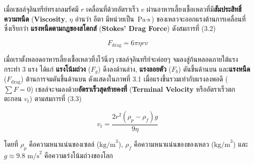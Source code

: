 เมื่อเซลล์จุลินทรีย์ทรงกลมรัศมี $r$ เคลื่อนที่ด้วยอัตราเร็ว $v$ ผ่านอาหารเลี้ยงเชื้อเหลวที่มี\textbf{สัมประสิทธิ์ความหนืด} (\textbf{Viscosity}, $\eta$ อ่านว่า อีตา มีหน่วยเป็น $\text{Pa}\cdot\text{s}$) ของเหลวจะออกแรงต้านการเคลื่อนที่ซึ่งเรียกว่า \textbf{แรงหนืดตามกฎของสโตกส์} (\textbf{Stokes' Drag Force}) ดังสมการที่ (3.2)

\begin{equation}
    F_{\text{drag}} = 6 \pi \eta r v
\end{equation}

เมื่อเราตั้งหลอดอาหารเลี้ยงเชื้อเหลวทิ้งไว้นิ่งๆ เซลล์จุลินทรีย์จะค่อยๆ จมลงสู่ก้นหลอดภายใต้แรงกระทำ 3 แรง ได้แก่ \textbf{แรงโน้มถ่วง} ($F_g$) ดึงลงด้านล่าง, \textbf{แรงลอยตัว} ($F_b$) ดันขึ้นด้านบน และ\textbf{แรงหนืด} ($F_{\text{drag}}$) ต้านการจมดันขึ้นด้านบน ดังแสดงใน\mbox{ภาพที่} 3.1 เมื่อแรงขึ้นรวมเท่ากับแรงลงพอดี ($\sum F = 0$) เซลล์จะจมลงด้วย\textbf{อัตราเร็วสุดท้ายคงที่} (\textbf{Terminal Velocity} หรืออัตราเร็วตกตะกอน $v_t$) ตามสมการที่ (3.3)

\begin{equation}
    v_t = \frac{2 r^2 (\rho_p - \rho_f) g}{9 \eta}
\end{equation}

โดยที่ $\rho_p$ คือความหนาแน่นของเซลล์ ($\text{kg/m}^3$), $\rho_f$ คือความหนาแน่นของของเหลว ($\text{kg/m}^3$) และ $g \approx 9.8\text{ m/s}^2$ คือความเร่งโน้มถ่วงของโลก

